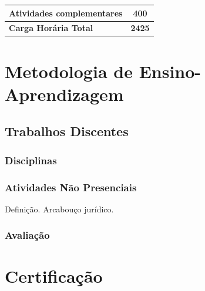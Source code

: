 \documentclass[11pt,fleqn]{book} %
\begin{document}
\begin{table}[]
{\begin{tabular}{|l|l|c|c|c|c|c|c|}
				\multicolumn{7}{|l|}{\textbf{Atividades complementares}}                                                                                                                                                         & \textbf{400}  \\ \hline
				\multicolumn{7}{|l|}{\textbf{Carga Horária Total}}                                                                                                                                                               & \textbf{2425} \\ \hline
			\end{tabular}%
		}
	\end{table}


\section{Metodologia de Ensino-Aprendizagem}\label{metodologia}


\subsection{Trabalhos Discentes}\label{trabdiscentes}

\subsubsection{Disciplinas}\label{dsiciplinas}


\subsubsection{Atividades Não Presenciais}

Definição. Arcabouço jurídico.


\subsubsection{Avaliação}


\section{Certificação}
\end{document}
